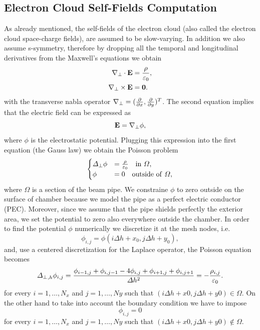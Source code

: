 \subsection{Electron Cloud Self-Fields Computation}
\label{subsec:ecloudfield}
As already mentioned, the self-fields of the electron cloud (also called the electron cloud space-charge fields), are assumed to be slow-varying. In addition we also assume s-symmetry, therefore by dropping all the temporal and longitudinal derivatives from the Maxwell's equations we obtain 
\begin{align*}
    \nabla_{\perp} \cdot \mathbf{E} &= \frac{\rho}{\varepsilon_0},\\
    \nabla_{\perp} \times \mathbf{E} &= \mathbf{0}.
\end{align*}
with the transverse nabla operator $\nabla_{\perp} = (\frac{\partial}{\partial x}, \frac{\partial}{\partial y})^T$.
The second equation implies that the electric field can be expressed as $$\mathbf{E} = \nabla_{\perp} \phi,$$ where $\phi$ is the electrostatic potential. Plugging this expression into the first equation (the Gauss law) we obtain the Poisson problem 
\begin{align*}
    \begin{cases}
        \lapxy \phi&= \frac{\rho}{\varepsilon_0} \quad \mathrm{in} \ \Omega,\\
        \phi&= 0 \quad \mathrm{outside} \ \mathrm{of} \ \Omega,
    \end{cases}
\end{align*}
where $\Omega$ is a section of the beam pipe. We constraine $\phi$ to zero outside on the surface of chamber because we model the pipe as a perfect electric conductor (PEC). Moreover, since we assume that the pipe shields perfectly the exterior area, we set the potential to zero also everywhere outside the chamber.
In order to find the potential $\phi$ numerically we discretize it at the mesh nodes, i.e.
$$\phi_{i, j} = \phi(i \Delta h + x_0, j \Delta h + y_0),$$ and, use a centered discretization for the Laplace operator, the Poisson equation becomes $${\Delta_{\perp}}_{,h} \phi_{i,j} = \frac{\phi_{i-1, j} + \phi_{i, j - 1} - 4\phi_{i,j} + \phi_{i + 1, j} + \phi_{i, j + 1}}{\Delta h^2} = -\frac{\rho_{i, j}}{\varepsilon_0}.$$
for every $i = 1, \dots ,N_x$ and $j = 1, \dots, Ny$ such that $(i\Delta h + x0, j\Delta h + y0) \in \Omega$.
On the other hand to take into account the boundary condition we have to impose $$\phi_{i,j} = 0$$
for every $i = 1, \dots ,N_x$ and $j = 1, \dots, Ny$ such that $(i\Delta h + x0, j\Delta h + y0) \notin \Omega$.\\
